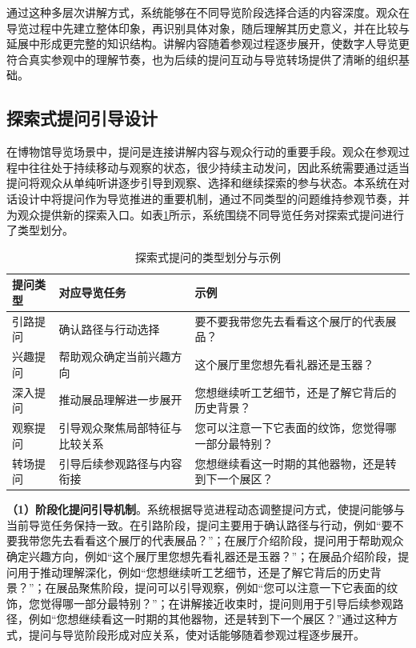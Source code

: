 通过这种多层次讲解方式，系统能够在不同导览阶段选择合适的内容深度。观众在导览过程中先建立整体印象，再识别具体对象，随后理解其历史意义，并在比较与延展中形成更完整的知识结构。讲解内容随着参观过程逐步展开，使数字人导览更符合真实参观中的理解节奏，也为后续的提问互动与导览转场提供了清晰的组织基础。

\subsection{探索式提问引导设计}
在博物馆导览场景中，提问是连接讲解内容与观众行动的重要手段。观众在参观过程中往往处于持续移动与观察的状态，很少持续主动发问，因此系统需要通过适当提问将观众从单纯听讲逐步引导到观察、选择和继续探索的参与状态。本系统在对话设计中将提问作为导览推进的重要机制，通过不同类型的问题维持参观节奏，并为观众提供新的探索入口。如表\ref{tab:question_types_examples}所示，系统围绕不同导览任务对探索式提问进行了类型划分。

\begin{table}[htbp]
\centering
\caption{探索式提问的类型划分与示例}
\label{tab:question_types_examples}
\renewcommand{\arraystretch}{1.35}
\setlength{\tabcolsep}{6pt}
\begin{tabularx}{\textwidth}{>{\raggedright\arraybackslash}p{2.8cm} >{\raggedright\arraybackslash}p{3.8cm} >{\raggedright\arraybackslash}X}
\toprule
提问类型 & 对应导览任务 & 示例 \\
\midrule
引路提问 & 确认路径与行动选择 & 要不要我带您先去看看这个展厅的代表展品？ \\
兴趣提问 & 帮助观众确定当前兴趣方向 & 这个展厅里您想先看礼器还是玉器？ \\
深入提问 & 推动展品理解进一步展开 & 您想继续听工艺细节，还是了解它背后的历史背景？ \\
观察提问 & 引导观众聚焦局部特征与比较关系 & 您可以注意一下它表面的纹饰，您觉得哪一部分最特别？ \\
转场提问 & 引导后续参观路径与内容衔接 & 您想继续看这一时期的其他器物，还是转到下一个展区？ \\
\bottomrule
\end{tabularx}
\end{table}

\textbf{（1）阶段化提问引导机制}。系统根据导览进程动态调整提问方式，使提问能够与当前导览任务保持一致。在引路阶段，提问主要用于确认路径与行动，例如“要不要我带您先去看看这个展厅的代表展品？”；在展厅介绍阶段，提问用于帮助观众确定兴趣方向，例如“这个展厅里您想先看礼器还是玉器？”；在展品介绍阶段，提问用于推动理解深化，例如“您想继续听工艺细节，还是了解它背后的历史背景？”；在展品聚焦阶段，提问可以引导观察，例如“您可以注意一下它表面的纹饰，您觉得哪一部分最特别？”；在讲解接近收束时，提问则用于引导后续参观路径，例如“您想继续看这一时期的其他器物，还是转到下一个展区？”通过这种方式，提问与导览阶段形成对应关系，使对话能够随着参观过程逐步展开。


